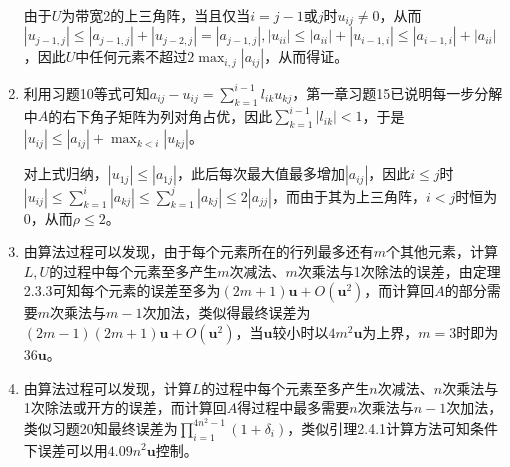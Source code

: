 \documentclass[a4paper,UTF8,fontset=windows]{ctexart}
\begin{document}
\begin{enumerate}
由于$U$为带宽2的上三角阵，当且仅当$i=j-1$或$j$时$u_{ij}\ne0$，从而$|u_{j-1,j}|\le|a_{j-1,j}|+|u_{j-2,j}|=|a_{j-1,j}|,|u_{ii}|\le|a_{ii}|+|u_{i-1,i}|\le|a_{i-1,i}|+|a_{ii}|$，因此$U$中任何元素不超过$2\max_{i,j}|a_{ij}|$，从而得证。

\item
利用习题10等式可知$a_{ij}-u_{ij}=\sum_{k=1}^{i-1}l_{ik}u_{kj}$，第一章习题15已说明每一步分解中$A$的右下角子矩阵为列对角占优，因此$\sum_{k=1}^{i-1}|l_{ik}|<1$，于是$|u_{ij}|\le|a_{ij}|+\max_{k<i}|u_{kj}|$。

对上式归纳，$|u_{1j}|\le|a_{1j}|$，此后每次最大值最多增加$|a_{ij}|$，因此$i\le j$时$|u_{ij}|\le\sum_{k=1}^i|a_{kj}|\le\sum_{k=1}^j|a_{kj}|\le2|a_{jj}|$，而由于其为上三角阵，$i<j$时恒为0，从而$\rho\le2$。

\item
由算法过程可以发现，由于每个元素所在的行列最多还有$m$个其他元素，计算$L,U$的过程中每个元素至多产生$m$次减法、$m$次乘法与1次除法的误差，由定理2.3.3可知每个元素的误差至多为$(2m+1)\mathbf{u}+O(\mathbf{u}^2)$，而计算回$A$的部分需要$m$次乘法与$m-1$次加法，类似得最终误差为$(2m-1)(2m+1)\mathbf{u}+O(\mathbf{u}^2)$，当$\mathbf{u}$较小时以$4m^2\mathbf{u}$为上界，$m=3$时即为$36\mathbf{u}$。

\item
由算法过程可以发现，计算$L$的过程中每个元素至多产生$n$次减法、$n$次乘法与1次除法或开方的误差，而计算回$A$得过程中最多需要$n$次乘法与$n-1$次加法，类似习题20知最终误差为$\prod_{i=1}^{4n^2-1}(1+\delta_i)$，类似引理2.4.1计算方法可知条件下误差可以用$4.09n^2\mathbf{u}$控制。
\end{enumerate}
\end{document}
